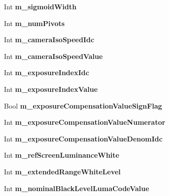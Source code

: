 \begin{DoxyCompactItemize}
Int {\bfseries m\+\_\+sigmoid\+Width}
\item 
\mbox{\label{class_t_enc_cfg_afa802453a6fb179aed5e9ee220ab6c89}} 
Int {\bfseries m\+\_\+num\+Pivots}
\item 
\mbox{\label{class_t_enc_cfg_a7c3e7f80e71a413504e36aa7a352965c}} 
Int {\bfseries m\+\_\+camera\+Iso\+Speed\+Idc}
\item 
\mbox{\label{class_t_enc_cfg_a2eb4fc98df55c604a23af5ea76794f5e}} 
Int {\bfseries m\+\_\+camera\+Iso\+Speed\+Value}
\item 
\mbox{\label{class_t_enc_cfg_a288d2fecb970a4577d95acd989a1be34}} 
Int {\bfseries m\+\_\+exposure\+Index\+Idc}
\item 
\mbox{\label{class_t_enc_cfg_ad78d695b2df9eebac30dfac2d7beece6}} 
Int {\bfseries m\+\_\+exposure\+Index\+Value}
\item 
\mbox{\label{class_t_enc_cfg_a6a149a327ca6aacfa11e49a25a06ed70}} 
Bool {\bfseries m\+\_\+exposure\+Compensation\+Value\+Sign\+Flag}
\item 
\mbox{\label{class_t_enc_cfg_ae374566f8e064a4caa016ab9a03d3046}} 
Int {\bfseries m\+\_\+exposure\+Compensation\+Value\+Numerator}
\item 
\mbox{\label{class_t_enc_cfg_a7f2b3ac2081ed2d6545f2df30736467c}} 
Int {\bfseries m\+\_\+exposure\+Compensation\+Value\+Denom\+Idc}
\item 
\mbox{\label{class_t_enc_cfg_a873bab1b19cf9af864ebf81cb253d18e}} 
Int {\bfseries m\+\_\+ref\+Screen\+Luminance\+White}
\item 
\mbox{\label{class_t_enc_cfg_a9ba8190f1bcd57c3d3cb1b121e2db37c}} 
Int {\bfseries m\+\_\+extended\+Range\+White\+Level}
\item 
\mbox{\label{class_t_enc_cfg_a7f80e4a2991d1b83a6e7fbf7ca3b353b}} 
Int {\bfseries m\+\_\+nominal\+Black\+Level\+Luma\+Code\+Value}
\item 

\end{DoxyCompactItemize}
